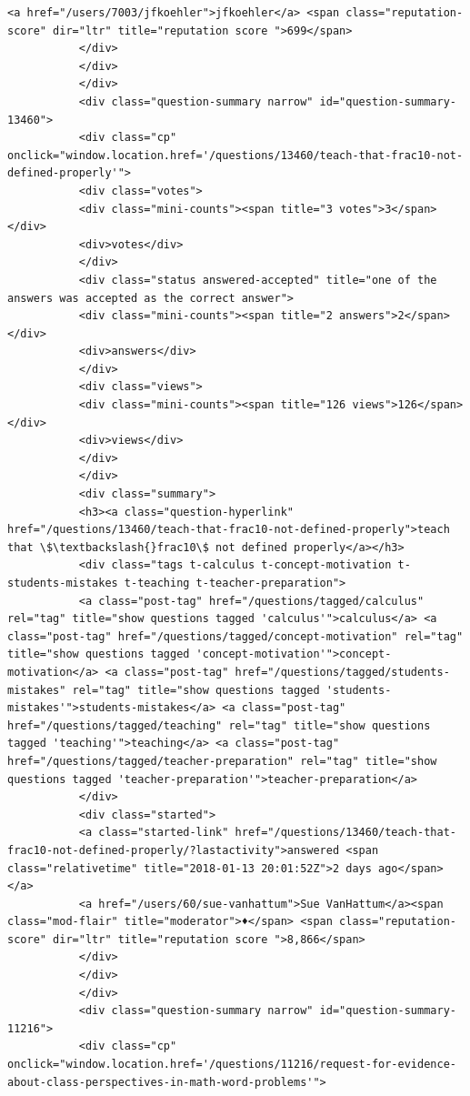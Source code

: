 \documentclass[11pt]{article}
\begin{document}
\begin{Verbatim}[commandchars=\\\{\}]
           <a href="/users/7003/jfkoehler">jfkoehler</a> <span class="reputation-score" dir="ltr" title="reputation score ">699</span>
           </div>
           </div>
           </div>
           <div class="question-summary narrow" id="question-summary-13460">
           <div class="cp" onclick="window.location.href='/questions/13460/teach-that-frac10-not-defined-properly'">
           <div class="votes">
           <div class="mini-counts"><span title="3 votes">3</span></div>
           <div>votes</div>
           </div>
           <div class="status answered-accepted" title="one of the answers was accepted as the correct answer">
           <div class="mini-counts"><span title="2 answers">2</span></div>
           <div>answers</div>
           </div>
           <div class="views">
           <div class="mini-counts"><span title="126 views">126</span></div>
           <div>views</div>
           </div>
           </div>
           <div class="summary">
           <h3><a class="question-hyperlink" href="/questions/13460/teach-that-frac10-not-defined-properly">teach that \$\textbackslash{}frac10\$ not defined properly</a></h3>
           <div class="tags t-calculus t-concept-motivation t-students-mistakes t-teaching t-teacher-preparation">
           <a class="post-tag" href="/questions/tagged/calculus" rel="tag" title="show questions tagged 'calculus'">calculus</a> <a class="post-tag" href="/questions/tagged/concept-motivation" rel="tag" title="show questions tagged 'concept-motivation'">concept-motivation</a> <a class="post-tag" href="/questions/tagged/students-mistakes" rel="tag" title="show questions tagged 'students-mistakes'">students-mistakes</a> <a class="post-tag" href="/questions/tagged/teaching" rel="tag" title="show questions tagged 'teaching'">teaching</a> <a class="post-tag" href="/questions/tagged/teacher-preparation" rel="tag" title="show questions tagged 'teacher-preparation'">teacher-preparation</a>
           </div>
           <div class="started">
           <a class="started-link" href="/questions/13460/teach-that-frac10-not-defined-properly/?lastactivity">answered <span class="relativetime" title="2018-01-13 20:01:52Z">2 days ago</span></a>
           <a href="/users/60/sue-vanhattum">Sue VanHattum</a><span class="mod-flair" title="moderator">♦</span> <span class="reputation-score" dir="ltr" title="reputation score ">8,866</span>
           </div>
           </div>
           </div>
           <div class="question-summary narrow" id="question-summary-11216">
           <div class="cp" onclick="window.location.href='/questions/11216/request-for-evidence-about-class-perspectives-in-math-word-problems'">

\end{Verbatim}
\end{document}
